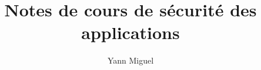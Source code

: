 \documentclass[a4paper, 12pt]{article}
\title{Notes de cours de sécurité des applications}
\author{Yann Miguel}
\begin{document}
\ttfamily
\maketitle
\tableofcontents
\newpage




\end{document}
